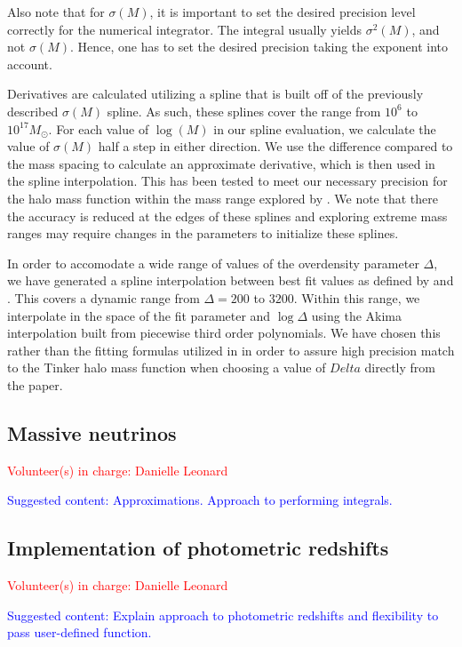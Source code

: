 \documentclass[\docopts]{\docclass}
\newcommand{\vol}[1]{\textcolor{red}{Volunteer(s) in charge: #1}}
\newcommand{\cont}[1]{\textcolor{blue}{Suggested content: #1}}
\begin{document}
Also note that for $\sigma(M)$, it is important to set the desired precision level correctly for the numerical integrator. The integral usually yields $\sigma^2(M)$, and not $\sigma(M)$. Hence, one has to set the desired precision taking the exponent into account.

Derivatives are calculated utilizing a spline that is built off of the previously described $\sigma(M)$ spline. As such, these splines cover the range from $10^6$ to $10^{17} M_\odot$. For each value of $\log(M)$ in our spline evaluation, we calculate the value of $\sigma(M)$ half a step in either direction. We use the difference compared to the mass spacing to calculate an approximate derivative, which is then used in the spline interpolation. This has been tested to meet our necessary precision for the halo mass function within the mass range explored by \citet{Tinker2010}. We note that there the accuracy is reduced at the edges of these splines and exploring extreme mass ranges may require changes in the parameters to initialize these splines.

In order to accomodate a wide range of values of the overdensity parameter $\Delta$, we have generated a spline interpolation between best fit values as defined by \citet{Tinker2008} and \citet{Tinker2010}. This covers a dynamic range from $\Delta=200$ to $3200$. Within this range, we interpolate in the space of the fit parameter and $\log\Delta$ using the Akima interpolation built from piecewise third order polynomials. We have chosen this rather than the fitting formulas utilized in \citet{Tinker2010} in order to assure high precision match to the Tinker halo mass function when choosing a value of $Delta$ directly from the paper. 


\subsection{Massive neutrinos}
\vol{Danielle Leonard}

\cont{Approximations. Approach to performing integrals.}

\subsection{Implementation of photometric redshifts}
\vol{Danielle Leonard}

\cont{Explain approach to photometric redshifts and flexibility to pass user-defined function.}
\end{document}
